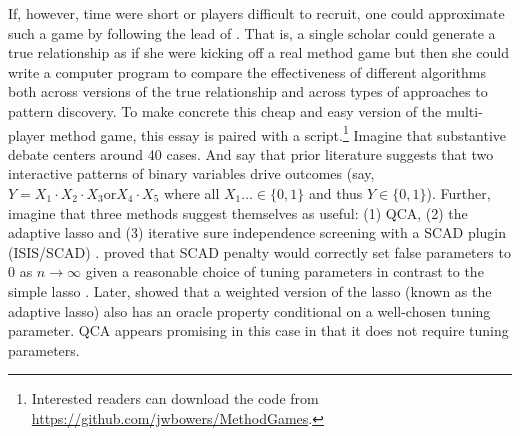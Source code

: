 \documentclass[12pt]{article}
\begin{document}
If, however, time were short or players difficult to recruit, one could
approximate such a game by following the lead of \citet{lucasfk2013}. That is,
a single scholar could generate a true relationship as if she were kicking off
a real method game but then she could write a computer program to compare the
effectiveness of different algorithms both across versions of the true
relationship and across types of approaches to pattern discovery. To make
concrete this cheap and easy version of the multi-player method game, this
essay is paired with a script.\footnote{Interested readers can download the
  code from \url{https://github.com/jwbowers/MethodGames}.}
Imagine that substantive debate centers around 40 cases. And say that prior
literature suggests that two interactive patterns of binary variables drive
outcomes (say, $Y=X_1 \cdot X_2 \cdot X_3 \text{or} X_4 \cdot X_5$ where all
$X_1 \ldots  \in \{0,1\}$ and thus $Y \in \{0,1\}$).  Further, imagine that
three methods suggest themselves as useful: (1) QCA, (2) the adaptive lasso
and (3) iterative sure independence screening with a SCAD plugin (ISIS/SCAD)
\cite{fan2008sure}.  \cite{fan2001variable} proved that SCAD penalty would
correctly set false parameters to 0 as $n \rightarrow \infty$ given a
reasonable choice of tuning parameters in contrast to the simple lasso
\cite{tibshirani1996regression}.  Later, \citet{zou2006adaptive} showed that a
weighted version of the lasso (known as the adaptive lasso) also has an oracle
property conditional on a well-chosen tuning parameter. QCA appears promising
in this case in that it does not require tuning parameters.
\end{document}
